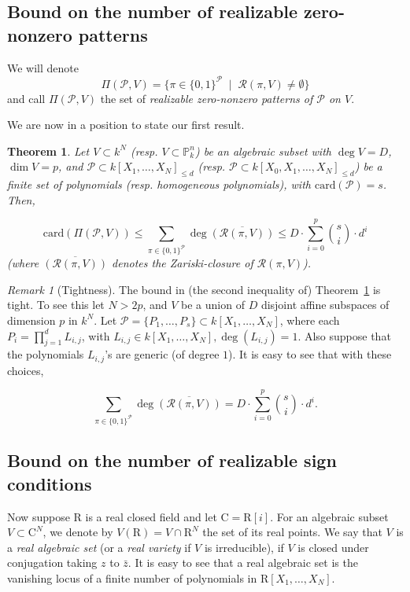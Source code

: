 \documentclass[10pt]{amsart}
\newtheorem{theorem}{Theorem}
\theoremstyle{definition}
\theoremstyle{remark}
\newtheorem{remark}{Remark}
\numberwithin{equation}{section}
\newcommand {\R} {\mathrm{R}}
\newcommand {\C}     {\mathrm{C}}
\newcommand {\RR} {{\mathcal R}}
\newcommand {\PP}     {\mathbb{P}} %
\newcommand{\card}{\mathrm{card}}
\begin{document}
\subsection{Bound on the number of realizable  zero-nonzero patterns}
We will denote
\[
\Pi(\mathcal{P},V) = \{\pi \in \{0,1\}^{\mathcal{P}} \;\mid\; \RR(\pi,V) \neq \emptyset \}
\]
and call $\Pi(\mathcal{P},V)$ the set of \emph{realizable zero-nonzero patterns of $\mathcal{P}$ on $V$}.

We are now in a position to state our first result.

\begin{theorem}
\label{thm:main:algebraic}
    Let $V \subset k^N$ (resp. $V \subset \PP_k^n$) be an algebraic subset 
    with $\deg V = D$, $\dim V = p$, and 
    $\mathcal{P} \subset k[X_1,\ldots,X_N]_{\leq d}$ (resp. $\mathcal{P} \subset k[X_0,X_1,\ldots,X_N]_{\leq d}$)   be a finite set of polynomials (resp. homogeneous polynomials), with $\card(\mathcal{P}) = s$. Then,
    
    \[
    \card(\Pi(\mathcal{P},V)) \leq
        \sum_{\pi \in \{0,1\}^{\mathcal{P}}} \deg \overline{(\RR(\pi,V))}         \leq 
        D \cdot \sum_{i=0}^p \binom{s}{i} \cdot  d^{i} 
    \]
    (where $\overline{(\RR(\pi,V))}$ denotes the Zariski-closure of
    $\RR(\pi,V)$).
\end{theorem}

\begin{remark} [Tightness]
\label{rem:tight:algebraic}
The bound in (the second inequality of)
Theorem~\ref{thm:main:algebraic} is tight. To see this let $N > 2p$, and $V$ be a union of 
$D$ disjoint affine subspaces of dimension $p$ in $k^N$. Let 
$\mathcal{P} = \{P_1,\ldots,P_s\} \subset k[X_1,\ldots,X_N]$, where each $P_i = \prod_{j=1}^{d} L_{i,j}$, with  $L_{i,j} \in k[X_1,\ldots,X_N], \deg(L_{i,j}) =1$. 
Also suppose that the polynomials 
$L_{i,j}$'s are generic (of degree $1$). It is easy to see that with these choices,

\[
\sum_{\pi \in \{0,1\}^{\mathcal{P}}} \deg \overline{(\RR(\pi,V))}         = 
D \cdot \sum_{i=0}^p \binom{s}{i} \cdot  d^{i}.
\]
\end{remark}

\subsection{Bound on the number of realizable sign conditions}
Now suppose $\R$ is a real closed field and let $\C = \R[i]$.
For an algebraic subset $V \subset \C^N$, we denote by $V(\R) = V \cap \R^N$
the set of its real points. We say that $V$ is a \emph{real algebraic set} (or a \emph{real variety} if $V$ is irreducible),
if $V$ is closed under conjugation taking $z$ to $\bar{z}$. It is easy to see that a real algebraic set is the vanishing locus of a finite number of polynomials in $\R[X_1,\ldots,X_N]$.
\end{document}
